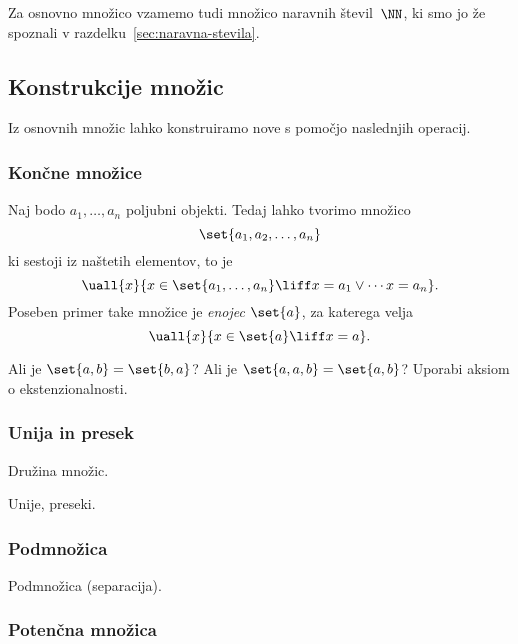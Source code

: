 Za osnovno množico vzamemo tudi množico naravnih števil~$\NN$, ki smo jo že spoznali v razdelku~\ref{sec:naravna-stevila}.

\subsection{Konstrukcije množic}
\label{sec:konstrukcije-mnozic}

Iz osnovnih množic lahko konstruiramo nove s pomočjo naslednjih operacij.

\subsubsection{Končne množice}
\label{sec:koncne-mnozice}

Naj bodo $a_1, \ldots, a_n$ poljubni objekti. Tedaj lahko tvorimo množico
%
\begin{equation*}
  \set{a_1, a_2, \ldots, a_n}
\end{equation*}
%
ki sestoji iz naštetih elementov, to je
%
\begin{equation*}
  \uall{x}{x \in \set{a_1, \ldots, a_n} \liff
    x = a_1 \lor \cdots x = a_n}.
\end{equation*}
%
Poseben primer take množice je \emph{enojec} $\set{a}$, za katerega velja
%
\begin{equation*}
  \uall{x}{x \in \set{a} \liff x = a}.
\end{equation*}


\begin{vaja}
  Ali je $\set{a, b} = \set{b, a}$? Ali je $\set{a, a, b} = \set{a, b}$? Uporabi aksiom o ekstenzionalnosti.
\end{vaja}

\subsubsection{Unija in presek}
\label{sec:unija-presek}

Družina množic.

Unije, preseki.

\subsubsection{Podmnožica}
\label{sec:podmnozica}

Podmnožica (separacija).

\subsubsection{Potenčna množica}
\label{sec:potencna-mnozica}

